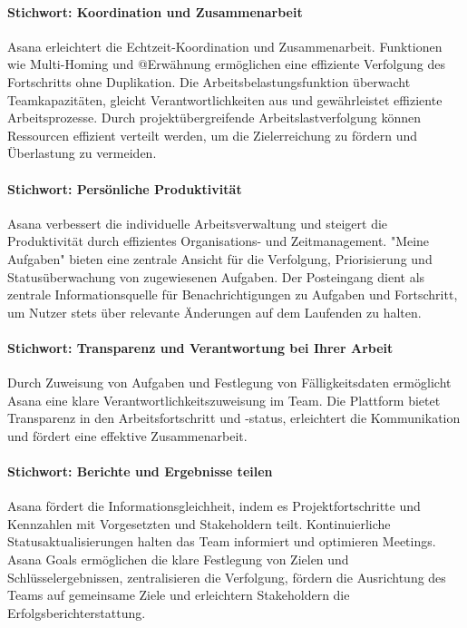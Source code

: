 \documentclass[sigconf, nonacm]{acmart}
\begin{document}
\paragraph{Stichwort: Koordination und Zusammenarbeit}
Asana erleichtert die Echtzeit-Koordination und Zusammenarbeit. Funktionen wie Multi-Homing und @Erwähnung ermöglichen eine effiziente Verfolgung des Fortschritts ohne Duplikation. Die Arbeitsbelastungsfunktion überwacht Teamkapazitäten, gleicht Verantwortlichkeiten aus und gewährleistet effiziente Arbeitsprozesse. Durch projektübergreifende Arbeitslastverfolgung können Ressourcen effizient verteilt werden, um die Zielerreichung zu fördern und Überlastung zu vermeiden.
\paragraph{Stichwort: Persönliche Produktivität}
Asana verbessert die individuelle Arbeitsverwaltung und steigert die Produktivität durch effizientes Organisations- und Zeitmanagement. "Meine Aufgaben" bieten eine zentrale Ansicht für die Verfolgung, Priorisierung und Statusüberwachung von zugewiesenen Aufgaben. Der Posteingang dient als zentrale Informationsquelle für Benachrichtigungen zu Aufgaben und Fortschritt, um Nutzer stets über relevante Änderungen auf dem Laufenden zu halten.
\paragraph{Stichwort: Transparenz und Verantwortung bei Ihrer Arbeit}
Durch Zuweisung von Aufgaben und Festlegung von Fälligkeitsdaten ermöglicht Asana eine klare Verantwortlichkeitszuweisung im Team. Die Plattform bietet Transparenz in den Arbeitsfortschritt und -status, erleichtert die Kommunikation und fördert eine effektive Zusammenarbeit.
\paragraph{Stichwort: Berichte und Ergebnisse teilen}
Asana fördert die Informationsgleichheit, indem es Projektfortschritte und Kennzahlen mit Vorgesetzten und Stakeholdern teilt. Kontinuierliche Statusaktualisierungen halten das Team informiert und optimieren Meetings. Asana Goals ermöglichen die klare Festlegung von Zielen und Schlüsselergebnissen, zentralisieren die Verfolgung, fördern die Ausrichtung des Teams auf gemeinsame Ziele und erleichtern Stakeholdern die Erfolgsberichterstattung.
\end{document}
